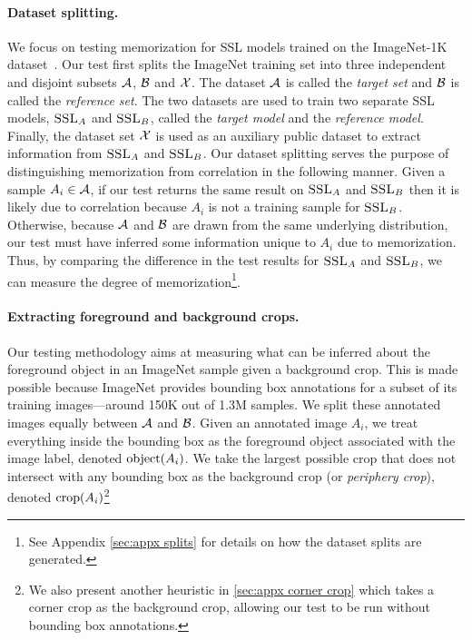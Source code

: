 \paragraph{Dataset splitting.} We focus on testing \dejavu memorization for SSL models trained on the ImageNet-1K dataset~\citep{imagenet}. Our test first splits the ImageNet training set into three independent and disjoint subsets $\mathcal{A}$, $\mathcal{B}$ and $\mathcal{X}$. The dataset $\mathcal{A}$ is called the \emph{target set} and $\mathcal{B}$ is called the \emph{reference set}. The two datasets are used to train two separate SSL models, $\textsc{SSL}_A$ and $\textsc{SSL}_B$, called the \emph{target model} and the \emph{reference model}. Finally, the dataset set $\mathcal{X}$ is used as an auxiliary public dataset to extract information from $\textsc{SSL}_A$ and $\textsc{SSL}_B$.
Our dataset splitting serves the purpose of distinguishing memorization from correlation in the following manner. Given a sample $A_i \in \mathcal{A}$, if our test returns the same result on $\textsc{SSL}_A$ and $\textsc{SSL}_B$ then it is likely due to correlation because $A_i$ is not a training sample for $\textsc{SSL}_B$. Otherwise, because $\mathcal{A}$ and $\mathcal{B}$ are drawn from the same underlying distribution, our test must have inferred some information unique to $A_i$ due to memorization. Thus, by comparing the difference in the test results for $\textsc{SSL}_A$ and $\textsc{SSL}_B$, we can measure the degree of \dejavu memorization\footnote{See Appendix \ref{sec:appx splits} for details on how the dataset splits are generated.}.
\vspace{-0.75em}
\paragraph{Extracting foreground and background crops.} Our testing methodology aims at measuring what can be inferred about the foreground object in an ImageNet sample given a background crop. This is made possible because ImageNet provides bounding box annotations for a subset of its training images---around 150K out of 1.3M samples. We split these annotated images equally between $\mathcal{A}$ and $\mathcal{B}$. Given an annotated image $A_i$, we treat everything inside the bounding box as the foreground object associated with the image label, denoted $\mathrm{object}({A_i})$. We take the largest possible crop that does not intersect with any bounding box as the background crop (or \emph{periphery crop}), denoted $\mathrm{crop}({A_i})$\footnote{We also present another heuristic in \cref{sec:appx corner crop} which takes a corner crop as the background crop, allowing our test to be run without bounding box annotations.}
\vspace{-0.75em}
